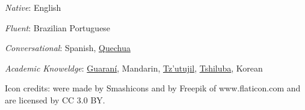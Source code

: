 \documentclass[
]{article}
\begin{document}
\emph{Native}: English

\emph{Fluent}: Brazilian Portuguese

\emph{Conversational}: Spanish,
\href{https://en.wikipedia.org/wiki/Quechuan_languages}{Quechua}

\emph{Academic Knoweldge}:
\href{https://en.wikipedia.org/wiki/Guarani_language}{Guaraní},
Mandarin,
\href{https://en.wikipedia.org/wiki/Tz’utujil_language}{Tz'utujil},
\href{https://en.wikipedia.org/wiki/Luba-Kasai_language}{Tshiluba},
Korean

{ Icon credits: were made by Smashicons and by Freepik of
www.flaticon.com and are licensed by CC 3.0 BY. }
\end{document}
